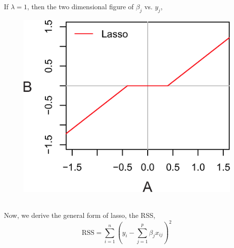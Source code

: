 \documentclass[12pt,a4paper]{article}%
\theoremstyle{definition}
\theoremstyle{plain}
\numberwithin{equation}{section}
\newcounter{subsubsubsection}[subsubsection]
\begin{document}
If $\lambda = 1$, then the two dimensional figure of $\beta_{j}$ vs. $y_{j}$,
\begin{figure}[H]
\centering
{}
\includegraphics[scale=0.8]{images//6_10.eps}
\\~\\
\caption{ }\label{softThresholding}
\end{figure}

Now, we derive the general form of lasso, the RSS,
\begin{equation}
\text{RSS} =  \sum\limits_{i=1}^{n} (y_{i}- \sum\limits_{j=1}^{p} \beta_{j} x_{ij})^{2}
\end{equation}
\end{document}

